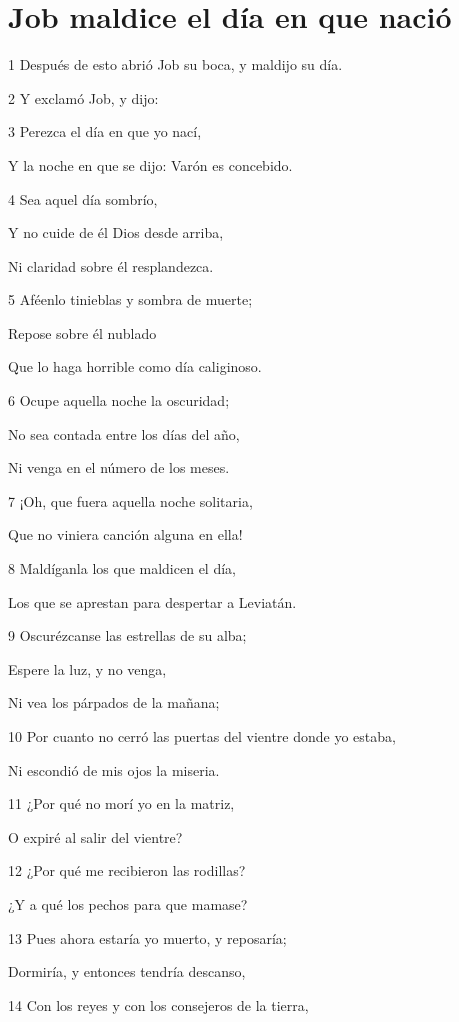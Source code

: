 \section*{Job maldice el día en que nació}

\par 1 Después de esto abrió Job su boca, y maldijo su día. 
\par 2 Y exclamó Job, y dijo:
\par 3 Perezca el día en que yo nací,
\par Y la noche en que se dijo: Varón es concebido.
\par 4 Sea aquel día sombrío,
\par Y no cuide de él Dios desde arriba,
\par Ni claridad sobre él resplandezca.
\par 5 Aféenlo tinieblas y sombra de muerte;
\par Repose sobre él nublado
\par Que lo haga horrible como día caliginoso.
\par 6 Ocupe aquella noche la oscuridad;
\par No sea contada entre los días del año,
\par Ni venga en el número de los meses.
\par 7 ¡Oh, que fuera aquella noche solitaria,
\par Que no viniera canción alguna en ella!
\par 8 Maldíganla los que maldicen el día,
\par Los que se aprestan para despertar a Leviatán.
\par 9 Oscurézcanse las estrellas de su alba;
\par Espere la luz, y no venga,
\par Ni vea los párpados de la mañana;
\par 10 Por cuanto no cerró las puertas del vientre donde yo estaba,
\par Ni escondió de mis ojos la miseria.
\par 11 ¿Por qué no morí yo en la matriz,
\par O expiré al salir del vientre?
\par 12 ¿Por qué me recibieron las rodillas?
\par ¿Y a qué los pechos para que mamase?
\par 13 Pues ahora estaría yo muerto, y reposaría;
\par Dormiría, y entonces tendría descanso,
\par 14 Con los reyes y con los consejeros de la tierra,

